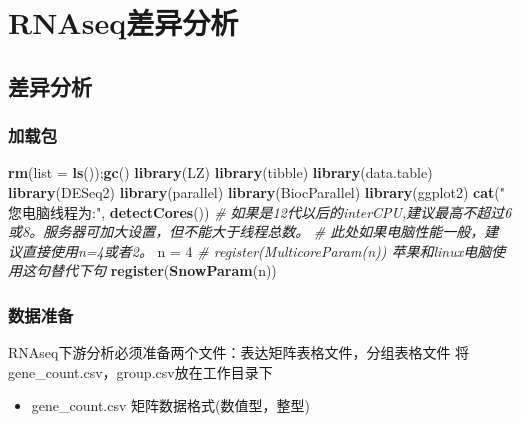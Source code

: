 \documentclass[
]{book}
\newenvironment{Shaded}{\begin{snugshade}}{\end{snugshade}}
\newcommand{\AttributeTok}[1]{\textcolor[rgb]{0.13,0.29,0.53}{#1}}
\newcommand{\CommentTok}[1]{\textcolor[rgb]{0.56,0.35,0.01}{\textit{#1}}}
\newcommand{\DecValTok}[1]{\textcolor[rgb]{0.00,0.00,0.81}{#1}}
\newcommand{\FunctionTok}[1]{\textcolor[rgb]{0.13,0.29,0.53}{\textbf{#1}}}
\newcommand{\NormalTok}[1]{#1}
\newcommand{\OtherTok}[1]{\textcolor[rgb]{0.56,0.35,0.01}{#1}}
\newcommand{\StringTok}[1]{\textcolor[rgb]{0.31,0.60,0.02}{#1}}
\providecommand{\tightlist}{%
  \setlength{\itemsep}{0pt}\setlength{\parskip}{0pt}}
\begin{document}
\hypertarget{deg}{%
\chapter{RNAseq差异分析}\label{deg}}

\hypertarget{deg-mian}{%
\section{差异分析}\label{deg-mian}}

\hypertarget{ux52a0ux8f7dux5305}{%
\subsection{加载包}\label{ux52a0ux8f7dux5305}}

\begin{Shaded}
\begin{Highlighting}[]
\FunctionTok{rm}\NormalTok{(}\AttributeTok{list =} \FunctionTok{ls}\NormalTok{());}\FunctionTok{gc}\NormalTok{()}
\FunctionTok{library}\NormalTok{(LZ)}
\FunctionTok{library}\NormalTok{(tibble)}
\FunctionTok{library}\NormalTok{(data.table)}
\FunctionTok{library}\NormalTok{(DESeq2)}
\FunctionTok{library}\NormalTok{(parallel)}
\FunctionTok{library}\NormalTok{(BiocParallel)}
\FunctionTok{library}\NormalTok{(ggplot2)}
\FunctionTok{cat}\NormalTok{(}\StringTok{" 您电脑线程为:"}\NormalTok{, }\FunctionTok{detectCores}\NormalTok{())}
\CommentTok{\# 如果是12代以后的interCPU,建议最高不超过6或8。服务器可加大设置，但不能大于线程总数。}
\CommentTok{\# 此处如果电脑性能一般，建议直接使用n=4或者2。}
\NormalTok{n }\OtherTok{=} \DecValTok{4}
\CommentTok{\# register(MulticoreParam(n)) 苹果和linux电脑使用这句替代下句}
\FunctionTok{register}\NormalTok{(}\FunctionTok{SnowParam}\NormalTok{(n))}
\end{Highlighting}
\end{Shaded}

\hypertarget{ux6570ux636eux51c6ux5907}{%
\subsection{数据准备}\label{ux6570ux636eux51c6ux5907}}

RNAseq下游分析必须准备两个文件：表达矩阵表格文件，分组表格文件
将gene\_count.csv，group.csv放在工作目录下

\begin{itemize}
\tightlist
\item
  gene\_count.csv 矩阵数据格式(数值型，整型)
\end{itemize}
\end{document}
